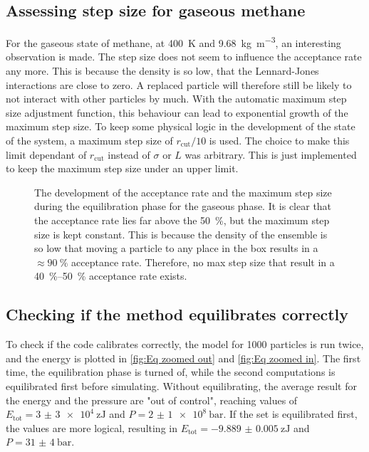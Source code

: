\subsection{Assessing step size for gaseous methane}
For the gaseous state of methane, at \SI{400}{\kelvin} and \SI{9.68}{\kg\per\meter^3}, an interesting observation is made. The step size does not seem to influence the acceptance rate any more. This is because the density is so low, that the Lennard-Jones interactions are close to zero. A replaced particle will therefore still be likely to not interact with other particles by much. With the automatic maximum step size adjustment function, this behaviour can lead to exponential growth of the maximum step size. To keep some physical logic in the development of the state of the system, a maximum step size of $r_\text{cut}/10$ is used. The choice to make this limit dependant of $r_\text{cut}$ instead of $\sigma$ or $L$ was arbitrary. This is just implemented to keep the maximum step size under an upper limit.

\begin{figure}[th!]
	\centering
	\small
	\def\svgwidth{0.95\columnwidth}
	
	\caption{The development of the acceptance rate and the maximum step size during the equilibration phase for the gaseous phase. It is clear that the acceptance rate lies far above the \SI{50}{\percent}, but the maximum step size is kept constant. This is because the density of the ensemble is so low that moving a particle to any place in the box results in a $\approx\SI{90}{\percent}$ acceptance rate. Therefore, no max step size that result in a \SIrange{40}{50}{\percent} acceptance rate exists.}
	\label{fig:EquilibratingGas}
\end{figure}

\subsection{Checking if the method equilibrates correctly}
To check if the code calibrates correctly, the model for \num{1000} particles is run twice, and the energy is plotted in \cref{fig:Eq zoomed out} and \cref{fig:Eq zoomed in}. The first time, the equilibration phase is turned of, while the second computations is equilibrated first before simulating. Without equilibrating, the average result for the energy and the pressure are "out of control", reaching values of $E_\text{tot}=\SI{3(3)e4}{\zepto\joule}$ and $P=\SI{2(1)e8}{\bar}$. If the set is equilibrated first, the values are more logical, resulting in $E_\text{tot}=\SI{-9.889(5)}{\zepto\joule}$ and $P=\SI{31(4)}{\bar}$. 

